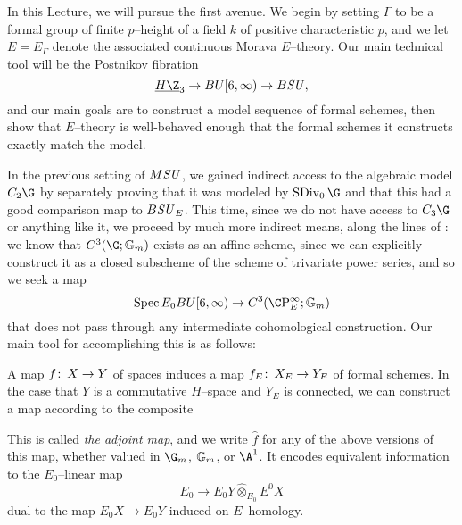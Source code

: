 In this Lecture, we will pursue the first avenue.  We begin by setting \(\Gamma\) to be a formal group of finite \(p\)--height of a field \(k\) of positive characteristic \(p\), and we let \(E = E_\Gamma\) denote the associated continuous Morava \(E\)--theory.  Our main technical tool will be the Postnikov fibration \[\OS{H\Z}{3} \to BU[6, \infty) \to B\SU,\] and our main goals are to construct a model sequence of formal schemes, then show that \(E\)--theory is well-behaved enough that the formal schemes it constructs exactly match the model.

In the previous setting of \(M\mathit{SU}\), we gained indirect access to the algebraic model \(C_2 \G\) by separately proving that it was modeled by \(\SDiv_0 \G\) and that this had a good comparison map to \(B\mathit{SU}_E\).  This time, since we do not have access to \(C_3 \G\) or anything like it, we proceed by much more indirect means, along the lines of : we know that \(C^3(\G; \Gm)\) exists as an affine scheme, since we can explicitly construct it as a closed subscheme of the scheme of trivariate power series, and so we seek a map \[\Spec E_0 BU[6, \infty) \to C^3(\CP^\infty_E; \Gm)\] that does not pass through any intermediate cohomological construction.  Our main tool for accomplishing this is as follows:
\begin{definition}
A map \(f\colon\thinspace X \to Y\) of spaces induces a map \(f_E \colon\thinspace X_E \to Y_E\) of formal schemes.  In the case that \(Y\) is a commutative \(H\)--space and \(Y_E\) is connected, we can construct a map according to the composite
\begin{center}
\end{center}
This is called \textit{the adjoint map}, and we write \(\widehat f\) for any of the above versions of this map, whether valued in \(\G_m\), \(\mathbb G_m\), or \(\A^1\).  It encodes equivalent information to the \(E_0\)--linear map \[E_0 \to E_0 Y \widehat\otimes_{E_0} E^0 X\] dual to the map \(E_0 X \to E_0 Y\) induced on \(E\)--homology.
\end{definition}

